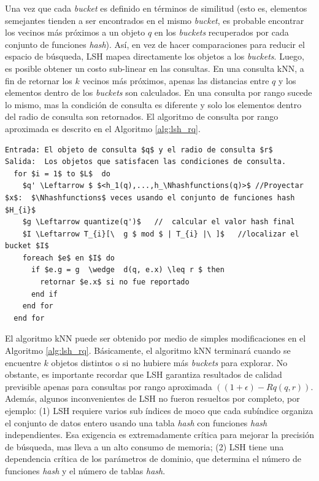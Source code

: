 Una vez que cada \textit{bucket} es definido en términos de similitud (esto es, elementos semejantes tienden a ser encontrados en el mismo \textit{bucket}, es probable encontrar los vecinos más próximos a un objeto $q$ en los \textit{buckets} recuperados por cada conjunto de funciones \textit{hash}). Así, en vez de hacer comparaciones para reducir el espacio de búsqueda, LSH mapea directamente los objetos a los \textit{buckets}. Luego, es posible obtener un costo sub-linear en las consultas. En una consulta kNN, a fin de retornar los $k$ vecinos más próximos, apenas las distancias entre $q$ y los elementos dentro de los \textit{buckets} son calculados. En una consulta por rango sucede lo mismo, mas la condición de consulta es diferente y solo los elementos dentro del radio de consulta son retornados. El algoritmo de consulta por rango aproximada es descrito en el Algoritmo  \ref{alg:lsh_rq}.

\begin{lstlisting}[mathescape, frame=single, label=alg:lsh_rq,caption=Consulta por rango aproximada usando LSH]
Entrada: El objeto de consulta $q$ y el radio de consulta $r$
Salida:  Los objetos que satisfacen las condiciones de consulta.
  for $i = 1$ to $L$  do
    $q' \Leftarrow $ $<h_1(q),...,h_\Nhashfunctions(q)>$ //Proyectar $x$:  $\Nhashfunctions$ veces usando el conjunto de funciones hash $H_{i}$
    $g \Leftarrow quantize(q')$   //  calcular el valor hash final
    $I \Leftarrow T_{i}[\  g $ mod $ | T_{i} |\ ]$   //localizar el bucket $I$
    foreach $e$ en $I$ do
      if $e.g = g  \wedge  d(q, e.x) \leq r $ then
        retornar $e.x$ si no fue reportado
      end if
    end for
  end for
\end{lstlisting}

El algoritmo kNN puede ser obtenido por medio de simples modificaciones en el Algoritmo \ref{alg:lsh_rq}. Básicamente, el algoritmo kNN terminará cuando se encuentre $k$ objetos distintos o si no hubiere más \textit{buckets} para explorar. No obstante, es importante recordar que LSH garantiza resultados de calidad previsible apenas para consultas por rango aproximada $((1+\epsilon)-Rq(q, r))$. Además, algunos inconvenientes de LSH no fueron resueltos por completo, por ejemplo: (1) LSH requiere varios sub índices de moco que cada subíndice organiza el conjunto de datos entero usando una tabla \textit{hash} con funciones \textit{hash} independientes. Esa exigencia es extremadamente crítica para mejorar la precisión de búsqueda, mas lleva a un alto consumo de memoria; (2) LSH tiene una dependencia crítica de los parámetros de dominio, que determina el número de funciones \textit{hash} y el número de tablas \textit{hash}.



